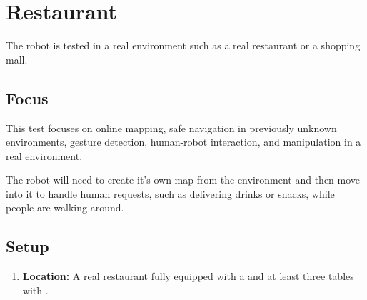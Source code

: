 \section{Restaurant}
The robot is tested in a real environment such as a real restaurant or a shopping mall.

\subsection{Focus}
This test focuses on online mapping, safe navigation in previously unknown environments, gesture detection, human-robot interaction, and manipulation in a real environment.

The robot will need to create it's own map from the environment and then move into it to handle human requests, such as delivering drinks or snacks, while people are walking around.

\subsection{Setup}
\begin{enumerate}
\item \textbf{Location:} A real restaurant fully equipped with a  and at least three tables with . 
\end{enumerate}

